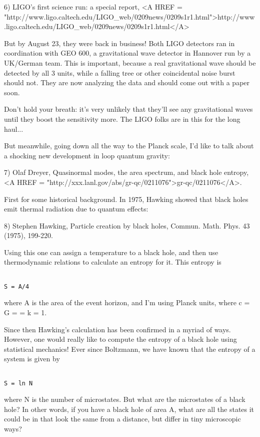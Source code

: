 6) LIGO's first science run: a special report,
<A HREF = "http://www.ligo.caltech.edu/LIGO_web/0209news/0209s1r1.html">http://www.ligo.caltech.edu/LIGO_web/0209news/0209s1r1.html</A>

But by August 23, they were back in business!  Both LIGO detectors ran
in coordination with GEO 600, a gravitational wave detector in Hannover
run by a UK/German team.   
This is important, because a real gravitational wave should be detected
by all 3 units, while a falling tree or other coincidental noise burst
should not.  They are now analyzing the data and should come out with a
paper soon.  

Don't hold your breath: it's very unlikely that they'll see any
gravitational waves until they boost the sensitivity more.  The
LIGO folks are in this for the long haul...

But meanwhile, going down all the way to the Planck scale, I'd like to
talk about a shocking new development in loop quantum gravity:


 7) Olaf Dreyer, Quasinormal modes, the area spectrum, and black hole
entropy, <A HREF = "http://xxx.lanl.gov/abs/gr-qc/0211076">gr-qc/0211076</A>.

First for some historical background.  In 1975, Hawking showed that
black holes emit thermal radiation due to quantum effects:

8) Stephen Hawking, Particle creation by black holes, Commun. Math. 
Phys. 43 (1975), 199-220.

Using this one can assign a temperature to a black hole, and then use
thermodynamic relations to calculate an entropy for it.  This entropy is


\begin{verbatim}

S = A/4
\end{verbatim}
    
where A is the area of the event horizon, and I'm using Planck units,
where c = G = \hbar  = k = 1.

Since then Hawking's calculation has been confirmed in a myriad of ways.
However, one would really like to compute the entropy of a black hole
using statistical mechanics!  Ever since Boltzmann, we have known that
the entropy of a system is given by


\begin{verbatim}

S = ln N
\end{verbatim}
    
where N is the number of microstates.  But what are the microstates of a
black hole?  In other words, if you have a black hole of area A, what
are all the states it could be in that look the same from a distance,
but differ in tiny microscopic ways?


